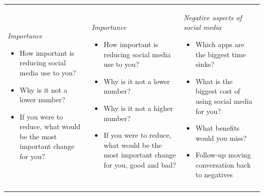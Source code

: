 \begin{tabularx}{\textwidth}{
  >{\raggedright\arraybackslash}X
  >{\raggedright\arraybackslash}X
  >{\raggedright\arraybackslash}X}
\vspace{-0.5em}
\begin{minipage}[t]{\linewidth}\vspace{0pt}
\textit{Importance}
\begin{itemize}[leftmargin=*,nosep]
\item How important is reducing social media use to you?
\item Why is it not a lower number?
\item If you were to reduce, what would be the most important change for you?
\end{itemize}
\end{minipage}
\vspace{-0.5em}
&
\vspace{-0.5em}
\begin{minipage}[t]{\linewidth}\vspace{0pt}
\textit{Importance}
\begin{itemize}[leftmargin=*,nosep]
\item How important is reducing social media use to you?
\item Why is it not a lower number?
\item Why is it not a higher number?
\item If you were to reduce, what would be the most important change for you, good and bad?
\end{itemize}
\end{minipage}
\vspace{-0.5em}
&
\vspace{-0.5em}
\begin{minipage}[t]{\linewidth}\vspace{0pt}
\textit{Negative aspects of social media}
\begin{itemize}[leftmargin=*,nosep]
\item Which apps are the biggest time sinks?
\item What is the biggest cost of using social media for you?
\item What benefits would you miss?
\item Follow-up moving conversation back to negatives
\end{itemize}
\end{minipage}
\vspace{-0.5em}
\\

\vspace{-0.5em}


\end{tabularx}
